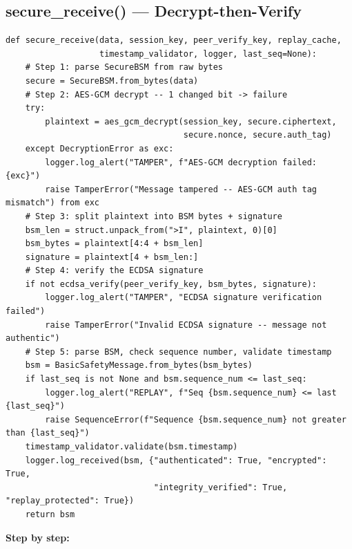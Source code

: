 \documentclass[11pt,a4paper]{report}
\begin{document}
\subsection{secure\_receive() --- Decrypt-then-Verify}
\begin{lstlisting}[style=py,caption={v2v\_protocol.py --- secure\_receive: the receiving pipeline.}]
def secure_receive(data, session_key, peer_verify_key, replay_cache,
                   timestamp_validator, logger, last_seq=None):
    # Step 1: parse SecureBSM from raw bytes
    secure = SecureBSM.from_bytes(data)
    # Step 2: AES-GCM decrypt -- 1 changed bit -> failure
    try:
        plaintext = aes_gcm_decrypt(session_key, secure.ciphertext,
                                    secure.nonce, secure.auth_tag)
    except DecryptionError as exc:
        logger.log_alert("TAMPER", f"AES-GCM decryption failed: {exc}")
        raise TamperError("Message tampered -- AES-GCM auth tag mismatch") from exc
    # Step 3: split plaintext into BSM bytes + signature
    bsm_len = struct.unpack_from(">I", plaintext, 0)[0]
    bsm_bytes = plaintext[4:4 + bsm_len]
    signature = plaintext[4 + bsm_len:]
    # Step 4: verify the ECDSA signature
    if not ecdsa_verify(peer_verify_key, bsm_bytes, signature):
        logger.log_alert("TAMPER", "ECDSA signature verification failed")
        raise TamperError("Invalid ECDSA signature -- message not authentic")
    # Step 5: parse BSM, check sequence number, validate timestamp
    bsm = BasicSafetyMessage.from_bytes(bsm_bytes)
    if last_seq is not None and bsm.sequence_num <= last_seq:
        logger.log_alert("REPLAY", f"Seq {bsm.sequence_num} <= last {last_seq}")
        raise SequenceError(f"Sequence {bsm.sequence_num} not greater than {last_seq}")
    timestamp_validator.validate(bsm.timestamp)
    logger.log_received(bsm, {"authenticated": True, "encrypted": True,
                              "integrity_verified": True, "replay_protected": True})
    return bsm
\end{lstlisting}
\textbf{Step by step:}
\end{document}
